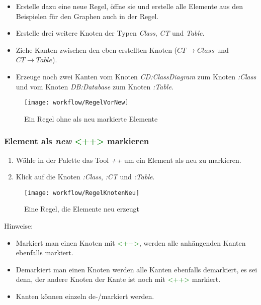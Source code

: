 		\begin{itemize}
			\item Erstelle dazu eine neue Regel, öffne sie und erstelle alle Elemente aus den Beispielen für den Graphen auch in der Regel.
			\item Erstelle drei weitere Knoten der Typen \textit{Class}, \textit{CT} und \textit{Table}.
			\item Ziehe Kanten zwischen den eben erstellten Knoten ($CT  \longrightarrow Class$ und $CT \longrightarrow Table$).
			\item Erzeuge noch zwei Kanten vom Knoten \textit{CD:ClassDiagram} zum Knoten \textit{:Class} und vom Knoten \textit{DB:Database} zum Knoten \textit{:Table}.
		\end{itemize}
		
		\begin{figure}[h!]%
			\centering
			\texttt{[image: workflow/RegelVorNew]}
			\caption{Ein Regel ohne als neu markierte Elemente}
			\label{fig:regelVorNew}
		\end{figure}		
			
		\subsubsection{Element als \textit{new} \textcolor{green}{<++>} markieren}
			\begin{enumerate}
				\item Wähle in der Palette das Tool \textit{++} um ein Element als neu zu markieren.
				\item Klick auf die Knoten \textit{:Class}, \textit{:CT} und \textit{:Table}.
			\end{enumerate}
			
			\begin{figure}[h!]%
				\centering
				\texttt{[image: workflow/RegelKnotenNeu]}
				\caption{Eine Regel, die Elemente neu erzeugt}
				\label{fig:regelKnotenNeu}
			\end{figure}
					
		Hinweise: 
		\begin{itemize}
			\item Markiert man einen Knoten mit \textcolor{green}{<++>}, werden alle anhängenden Kanten ebenfalls markiert.
			\item Demarkiert man einen Knoten werden alle Kanten ebenfalls demarkiert, es sei denn, der andere Knoten der Kante ist noch mit \textcolor{green}{<++>} markiert.
			\item Kanten können einzeln de-/markiert werden.
		\end{itemize}
		
